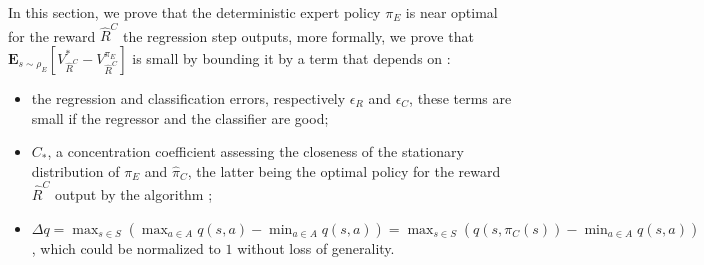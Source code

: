 \documentclass[smallextended]{svjour3}
\newcommand{\E}{\mathbf{E}}
\begin{document}
In this section, we prove that the deterministic expert policy $\pi_E$ is near optimal for the reward $\hat{R}^C$ the regression step outputs, more formally, we prove that $\E_{s\sim\rho_E}[V^*_{\hat{R}^C}-V^{\pi_E}_{\hat{R}^C}]$ is small by bounding it by a term that depends on :
\begin{itemize}
  \item the regression and classification errors, respectively $\epsilon_R$ and $\epsilon_C$, these terms are small if the regressor and the classifier are good;
  \item $C_*$, a concentration coefficient assessing the closeness of the stationary distribution of $\pi_E$ and $\hat \pi_C$, the latter being the optimal policy for the reward $\hat R^C$ output by the algorithm ;
  \item $\Delta q=\max_{s\in S}(\max_{a\in A}q(s,a)-\min_{a\in A}q(s,a))=\max_{s\in S}(q(s,\pi_C(s))-\min_{a\in A}q(s,a))$, which could be normalized to $1$ without loss of generality.
  \end{itemize}
\end{document}
